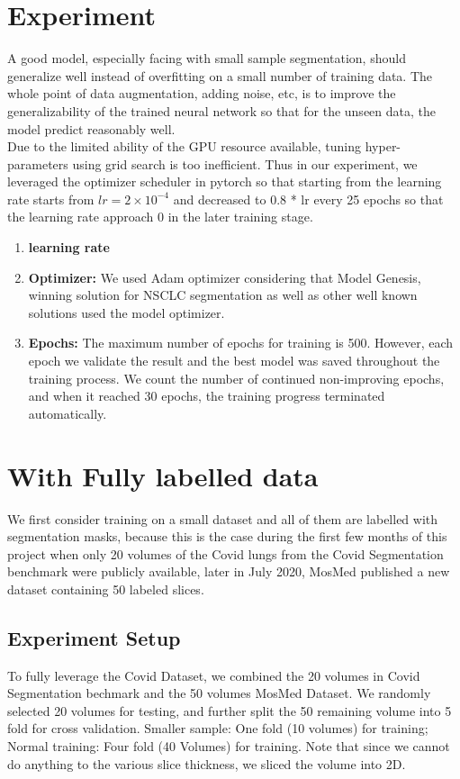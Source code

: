 \section{Experiment}
A good model, especially facing with small sample segmentation, should generalize well instead of overfitting on a small number of training data. The whole point of data augmentation, adding noise, etc, is to improve the generalizability of the trained neural network so that for the unseen data, the model predict reasonably well.\\

Due to the limited ability of the GPU resource available, tuning hyper-parameters using grid search is too inefficient. Thus in our experiment, we leveraged the optimizer scheduler in pytorch so that starting from the learning rate starts from $lr=2\times10^{-4}$ and decreased to 0.8 * lr every 25 epochs so that the learning rate approach 0 in the later training stage.  
\begin{enumerate}
	\item \textbf{learning rate}
	\item \textbf{Optimizer:} We used Adam optimizer considering that Model Genesis, winning solution for NSCLC segmentation as well as other well known solutions used the model optimizer.
	\item \textbf{Epochs:} The maximum number of epochs for training is 500. However, each epoch we validate the result and the best model was saved throughout the training process. We count the number of continued non-improving epochs, and when it reached 30 epochs, the training progress terminated automatically.
	\end{enumerate}

\section{With Fully labelled data}
We first consider training on a small dataset and all of them are labelled with segmentation masks, because this is the case during the first few months of this project when only 20 volumes of the Covid lungs from the Covid Segmentation benchmark were publicly available, later in July 2020, MosMed published a new dataset containing 50 labeled slices.

\subsection{Experiment Setup}
To fully leverage the Covid Dataset, we combined the 20 volumes in Covid Segmentation bechmark and the 50 volumes MosMed Dataset. We randomly selected 20 volumes for testing, and further split the 50 remaining volume into 5 fold for cross validation. Smaller sample: One fold (10 volumes) for training; Normal training: Four fold (40 Volumes) for training.
Note that since we cannot do anything to the various slice thickness, we sliced the volume into 2D.

